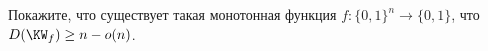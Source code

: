 Покажите, что существует такая монотонная функция $f: \{0, 1\}^n \to \{0, 1\}$, что $D(\KW_f) \ge n - o(n)$. 